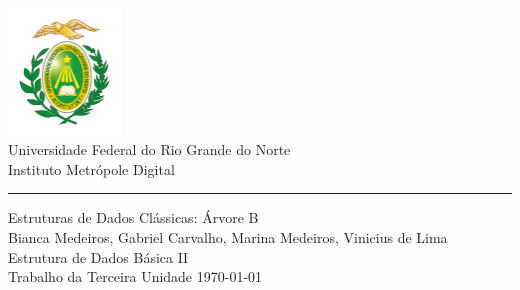 \documentclass[a4paper,11pt,oneside]{book}
\begin{document}

\frontmatter

\begin{titlepage}
	\begin{center}
		\includegraphics[width=3cm]{figures/ufrnlogo.png}\\[0.5cm]
		{\LARGE Universidade Federal do Rio Grande do Norte\\[0.5cm]
		Instituto Metrópole Digital}\\[2cm]
		{\color{blue} \rule{\textwidth}{1pt}}
		\linespread{1.2}\huge {
			Estruturas de Dados Clássicas: Árvore B
		}
		\linespread{1}~\\[2cm]
		{\Large
		Bianca Medeiros,
		Gabriel Carvalho,
		Marina Medeiros,
		Vinicius de Lima
		}\\[1cm]

		{\large
		\emph{} Estrutura de Dados Básica II}\\[1cm] %

		\large Trabalho da Terceira Unidade
		\vfill
		\today
	\end{center}
\end{titlepage}


\tableofcontents

\mainmatter





\nocite{*}
\end{document}
